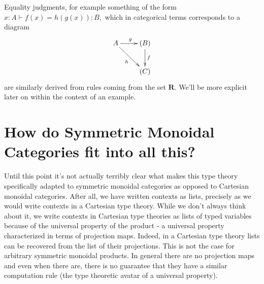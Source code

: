 \documentclass[pra,floatfix,
amsmath,superscriptaddress, 12pt]{article}
\theoremstyle{definition}
\begin{document}
Equality judgments, for example something of the form $x:A\vdash f\left(x\right)=h\left(g\left(x\right)\right):B,$ which in categorical terms corresponds to a diagram
%
\begin{eqnarray*}
    \vcenter{
                \vbox{
                    \xymatrix{
                        A
                        \ar[r]^{g}
                        \ar[dr]_{h}
                            &
                            (B)
                            \ar[d]^{f}
                                \\
                            &
                                (C)}}}
\end{eqnarray*}
%
%
are similarly derived from rules coming from the set $\mathbf{R}$. We'll be more explicit later on within the context of an example.

\section{How do Symmetric Monoidal Categories fit into all this?}


Until this point it's not actually terribly clear what makes this type theory specifically adapted to symmetric monoidal categories as opposed to Cartesian monoidal categories. After all, we have written contexts as lists, precisely as we would write contexts in a Cartesian type theory. 
%
%
While we don't always think about it, we write contexts in Cartesian type theories as lists of typed variables because of the universal property of the product - a universal property characterized in terms of projection maps. Indeed, in a Cartesian type theory lists can be recovered from the list of their projections. This is not the case for arbitrary symmetric monoidal products. In general there are no projection maps and even when there are, there is no guarantee that they have a similar computation rule (the type theoretic avatar of a universal property).
\end{document}

